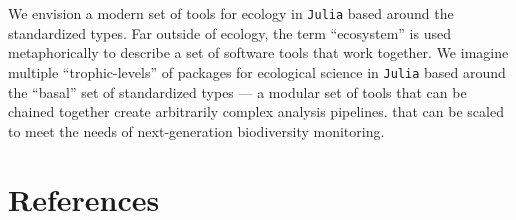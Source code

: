 \documentclass[11pt]{article}
\begin{document}
We envision a modern set of tools for ecology in \texttt{Julia} based
around the standardized types. Far outside of ecology, the term
``ecosystem'' is used metaphorically to describe a set of software tools
that work together. We imagine multiple ``trophic-levels'' of packages
for ecological science in \texttt{Julia} based around the ``basal'' set
of standardized types --- a modular set of tools that can be chained
together create arbitrarily complex analysis pipelines. that can be
scaled to meet the needs of next-generation biodiversity monitoring.

\hypertarget{references}{%
\section*{References}\label{references}}
\end{document}
